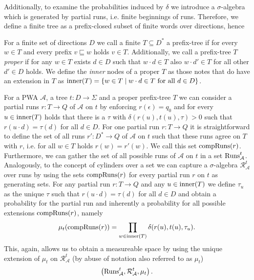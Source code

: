 Additionally, to examine the probabilities induced by $\delta$ we introduce a
$\sigma$-algebra which is generated by partial runs, i.e. finite beginnings of
runs. Therefore, we define a finite tree as a prefix-closed subset of finite
words over directions, hence
\begin{definition}
  For a finite set of directions $D$ we call a finite $T\subseteq D^{*}$ a
  prefix-tree if for every $w\in T$ and every prefix $v\sqsubseteq w$ holds 
  $v\in T$. Additionally, we call a prefix-tree $T$ \emph{proper} if for any 
  $w\in T$ exists $d\in D$ such that $w\cdot d\in T$ also $w\cdot d'\in T$ for 
  all other $d'\in D$ holds. We define the \emph{inner} nodes of a proper $T$ 
  as those notes that do have an extension in $T$ as
  $\operatorname{inner}(T) = \left\{w\in T\mid w\cdot d\in T\text{ for all }d\in D\right\}$.
\end{definition}
For a \ac{PWA} $\mathcal{A}$, a tree $t:D\rightarrow\Sigma$ and a proper 
prefix-tree $T$ we can consider a partial runs $r:T\rightarrow Q$ of 
$\mathcal{A}$ on $t$ by enforcing $r(\epsilon) = q_{0}$ and for every 
$u\in\operatorname{inner}(T)$ holds that there is a $\tau$ with $\delta(r(u), t(u), \tau)>0$
such that $r(u\cdot d) = \tau(d)$ for all $d\in D$. For one partial run 
$r:T\rightarrow Q$ it is straightforward to define the set of all runs 
$r':D^{*}\rightarrow Q$ of $\mathcal{A}$ on $t$ such that these runs agree on 
$T$ with $r$, i.e. for all $w\in T$ holds $r(w) = r'(w)$. We call this set 
$\operatorname{compRuns}(r)$. Furthermore, we can gather the set of all possible runs of 
$\mathcal{A}$ on $t$ in a set $\operatorname{Runs}_{\mathcal{A}}^{t}$. Analogously, to the 
concept of cylinders over a set we can capture a $\sigma$-algebra 
$\mathcal{R}_{\mathcal{A}}^{t}$ over runs by using the sets $\operatorname{compRuns}(r)$ for 
every partial run $r$ on $t$ as generating sets. For any partial run 
$r:T\rightarrow Q$ and any $u\in\operatorname{inner}(T)$ we define $\tau_{u}$ as the unique 
$\tau$ such that $r(u\cdot d) = \tau(d)$ for all $d\in D$ and obtain a 
probability for the partial run and inherently a probability for all possible
extensions $\operatorname{compRuns}(r)$, namely
\begin{equation*}
  \mu_{t}(\operatorname{compRuns}(r)) = \prod\limits_{w\in\operatorname{inner}(T)}
    \delta(r(u),t(u),\tau_{u}).
\end{equation*}
This, again, allows us to obtain a measureable space by using the unique 
extension of $\mu_{t}$ on $\mathcal{R}_{\mathcal{A}}^{t}$ (by abuse of notation
also referred to as $\mu_{t}$)
\begin{equation*}
  \left(\operatorname{Runs}_{\mathcal{A}}^{t}, \mathcal{R}_{\mathcal{A}}^{t}, \mu_{t}\right).
\end{equation*}
